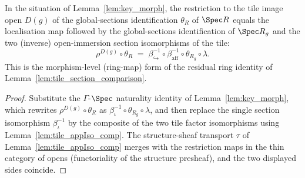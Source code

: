 \begin{lemma}\leanok
  \label{lem:tile_section_ring_identity}
  In the situation of Lemma~\ref{lem:key_morph}, the restriction to the tile image open \(D(g)\) of the
  global-sections identification \(\theta_R\) of \(\Spec R\) equals the localisation map followed by the
  global-sections identification of \(\Spec R_g\) and the two (inverse) open-immersion section
  isomorphisms of the tile:
  \[
    \rho^{D(g)} \circ \theta_R
    \;=\;
    \beta_{\hookrightarrow}^{-1} \circ \beta_{\mathrm{aff}}^{-1} \circ \theta_{R_g} \circ \lambda.
  \]
  This is the morphism-level (ring-map) form of the residual ring identity of
  Lemma~\ref{lem:tile_section_comparison}.
\end{lemma}
\begin{proof}
  \leanok
  Substitute the \(\Gamma\)-\(\Spec\) naturality identity of Lemma~\ref{lem:key_morph}, which rewrites
  \(\rho^{D(g)} \circ \theta_R\) as \(\beta_\iota^{-1} \circ \theta_{R_g} \circ \lambda\), and then
  replace the single section isomorphism \(\beta_\iota^{-1}\) by the composite of the two tile factor
  isomorphisms using Lemma~\ref{lem:tile_appIso_comp}. The structure-sheaf transport \(\tau\) of
  Lemma~\ref{lem:tile_appIso_comp} merges with the restriction maps in the thin category of opens
  (functoriality of the structure presheaf), and the two displayed sides coincide.
\end{proof}

